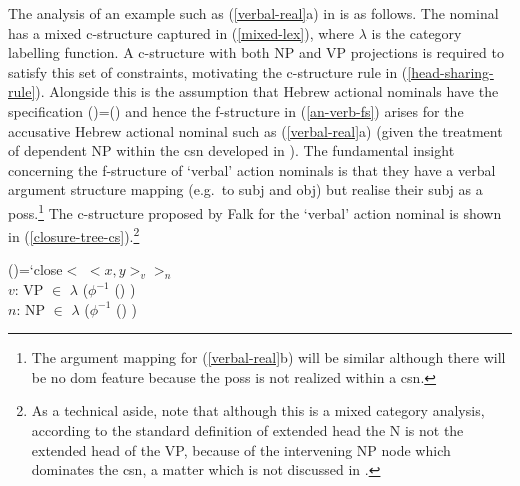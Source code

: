 \documentclass[output=paper,hidelinks]{langscibook}
\begin{document}
The analysis of an example such as (\ref{verbal-real}a) in \citet{Falk01actnom} is as follows.    The nominal has a mixed c-structure captured in (\ref{mixed-lex}), where $\lambda$ is the category labelling function. A c-structure with both NP and VP projections is required to satisfy this set of constraints, motivating the c-structure rule in (\ref{head-sharing-rule}).  Alongside this is the assumption that Hebrew actional nominals have the specification \mbox{(\UP\POSS)=(\UP\SUBJ)} and hence the f-structure in (\ref{an-verb-fs}) arises for the accusative Hebrew actional nominal such as (\ref{verbal-real}a) (given the treatment of dependent NP within the {\sc csn} developed in \citealt{Falk01actnom}). The fundamental insight concerning the f-structure of `verbal' action nominals is that they have a verbal argument structure mapping (e.g.\ to {\sc subj} and {\sc obj}) but realise their {\sc subj} as a {\sc poss}.\footnote{The argument mapping for  (\ref{verbal-real}b) will be similar although there will be no {\sc dom} feature because the {\sc poss} is not realized within a {\sc csn}.} The c-structure proposed by Falk for the `verbal' action nominal is shown in (\ref{closure-tree-cs}).\footnote{As a technical aside, note that although this is a mixed category analysis, according to the standard definition of extended head \citep[136]{BresnanEtAl2016} the N is not the extended head of the VP, because of the intervening NP node which dominates the {\sc csn}, a matter which is not discussed in \citet{Falk01actnom,Falk07}.}




\ea
\label{mixed-lex}
()=`close$<$ $<x, y>_{v} >_{n}$
\hfill{ \citep[96]{Falk01actnom}\\
$v$:  VP $\in$ $\lambda$ ($\phi^{-1}$ (\UP ) )\\
$n$:  NP $\in$ $\lambda$ ($\phi^{-1}$ (\UP) )}
\z


\ea \label{head-sharing-rule}  \hfill{\citep[94]{Falk01actnom}}
\z


\end{document}
